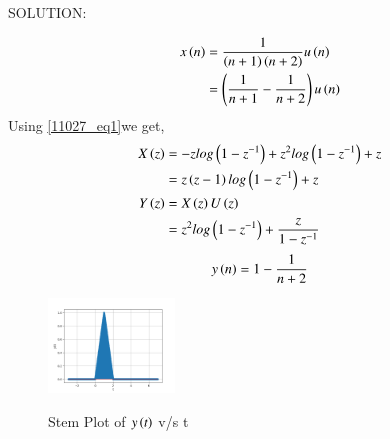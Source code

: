 \documentclass[journal,12pt,twocolumn]{IEEEtran}
\theoremstyle{remark}
\begin{document}
SOLUTION:
\begin{table}[ht]

\end{table}
\begin{align}
x\left(n\right) &= \frac{1}{\left(n+1\right)\left(n+2\right)}u\left(n\right)\\
& = \left(\frac{1}{n+1} - \frac{1}{n+2}\right)u\left(n\right)\\
\end{align}
Using \eqref{11027_eq1}we get,
\begin{align}X\left(z\right) &= -z log\left(1-z^{-1}\right) + z^2 log\left(1-z^{-1}\right) + z\\
&= z\left(z-1\right)log\left(1-z^{-1}\right) + z\\
    Y\left(z\right) &= X\left(z\right)U\left(z\right)\\
     &=z^2log\left(1-z^{-1}\right) + \frac{z}{1-z^{-1}} \\
\end{align}
\begin{align}
    y\left(n\right) &= 1 - \frac{1}{n+2}\\
\end{align}
\begin{figure}[h]
    \includegraphics[width=0.3\textwidth]{figs/y(t)_vs_t.png}\label{fig:stem-plot}
    \caption{Stem Plot of $y\left(t\right)$ v/s t}
\end{figure}
\end{document}
